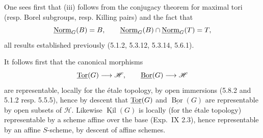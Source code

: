One sees first that (iii) follows from the conjugacy theorem for maximal tori (resp. Borel subgroups, resp. Killing pairs) and the fact that
\[
\underline{\mathrm{Norm}}_G(B)=B,\qquad\underline{\mathrm{Norm}}_G(B)\cap\underline{\mathrm{Norm}}_G(T)=T,
\]
all results established previously (5.1.2, 5.3.12, 5.3.14, 5.6.1).

It follows first that the canonical morphisms
\[
\underline{\operatorname{Tor}}(G)\longrightarrow\mathscr H,\qquad\underline{\operatorname{Bor}}(G)\longrightarrow\mathscr H
\]
are representable, locally for the \'etale topology, by open immersions (5.8.2 and 5.1.2 resp. 5.5.5), hence by descent that $\underline{\operatorname{Tor}}(G)$ and $\underline{\operatorname{Bor}}(G)$ are representable by open subsets of $\mathscr H$. Likewise $\underline{\operatorname{Kil}}(G)$ is locally (for the \'etale topology) representable by a scheme affine over the base (Exp.~IX 2.3), hence representable by an affine $S$-scheme, by descent of affine schemes.{\renewcommand{\thefootnote}{(52)}}

